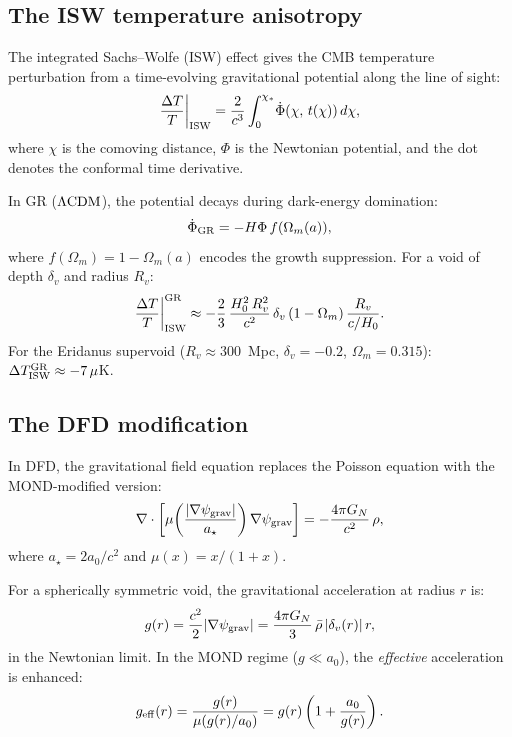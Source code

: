 \documentclass[11pt]{article}
\newcommand{\psigrav}{\psi_{\rm grav}}
\newcommand{\GN}{G_N}
\newcommand{\aM}{a_0}
\newcommand{\LCDM}{\Lambda{\rm CDM}}
\newcommand{\Hzero}{H_0}
\newcommand{\mufd}{\mu}
\begin{document}
\subsection{The ISW temperature anisotropy}

The integrated Sachs--Wolfe (ISW) effect gives the CMB temperature
perturbation from a time-evolving gravitational potential along the
line of sight:
\begin{equation}
\frac{\Delta T}{T}\bigg|_{\rm ISW}
= \frac{2}{c^3}\int_0^{\chi_*}\!\dot{\Phi}(\chi,\,t(\chi))\,d\chi,
\label{eq:ISW-general}
\end{equation}
where $\chi$ is the comoving distance, $\Phi$ is the Newtonian
potential, and the dot denotes the conformal time derivative.

In GR ($\LCDM$), the potential decays during dark-energy domination:
\begin{equation}
\dot{\Phi}_{\rm GR} = -H\Phi\,f(\Omega_m(a)),
\label{eq:Phi-dot-GR}
\end{equation}
where $f(\Omega_m) = 1 - \Omega_m(a)$ encodes the growth suppression.
For a void of depth $\delta_v$ and radius $R_v$:
\begin{equation}
\frac{\Delta T}{T}\bigg|_{\rm ISW}^{\rm GR}
\approx -\frac{2}{3}\,\frac{\Hzero^2\,R_v^2}{c^2}\,
\delta_v\,(1-\Omega_m)\,\frac{R_v}{c/\Hzero}.
\label{eq:ISW-GR-approx}
\end{equation}
For the Eridanus supervoid ($R_v \approx 300$~Mpc, $\delta_v = -0.2$,
$\Omega_m = 0.315$): $\Delta T_{\rm ISW}^{\rm GR} \approx -7\,\mu$K.

\subsection{The DFD modification}

In DFD, the gravitational field equation replaces the Poisson equation
with the MOND-modified version:
\begin{equation}
\nabla\cdot\left[\mufd\!\left(\frac{|\nabla\psigrav|}{a_\star}\right)
\nabla\psigrav\right] = -\frac{4\pi\GN}{c^2}\,\rho,
\label{eq:DFD-Poisson}
\end{equation}
where $a_\star = 2\aM/c^2$ and $\mufd(x) = x/(1+x)$.

For a spherically symmetric void, the gravitational acceleration at
radius $r$ is:
\begin{equation}
g(r) = \frac{c^2}{2}|\nabla\psigrav|
= \frac{4\pi \GN}{3}\,\bar{\rho}\,|\delta_v(r)|\,r,
\label{eq:g-void}
\end{equation}
in the Newtonian limit. In the MOND regime ($g \ll \aM$), the
\emph{effective} acceleration is enhanced:
\begin{equation}
g_{\rm eff}(r) = \frac{g(r)}{\mufd(g(r)/\aM)}
= g(r)\left(1 + \frac{\aM}{g(r)}\right).
\label{eq:g-eff-MOND}
\end{equation}
\end{document}
